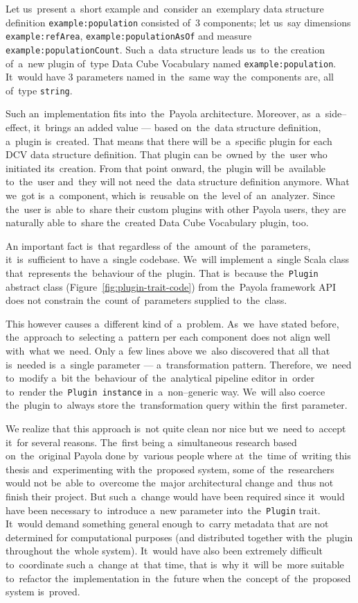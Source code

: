 \begin{sloppypar}
Let us~present a~short example and~consider an~exemplary data structure definition \texttt{example:population}
consisted of~3 
components; let us~say dimensions \texttt{example:refArea}, \texttt{example:populationAsOf}
and measure \texttt{example:populationCount}. Such a~data structure leads us~to~the creation of~a~new plugin of~type Data Cube Vocabulary named 
\texttt{example:population}. It~would have 3 parameters named in~the~same way the~components are, all of~type \texttt{string}.
\end{sloppypar}

Such an~implementation fits into~the~Payola architecture. Moreover, as~a~side--effect, it~brings
an added value --- based on~the~data structure definition, a~plugin is~created. 
That means that there will be~a~specific plugin for each DCV data structure 
definition. That plugin can be~owned by~the~user who initiated its~creation. 
From that point onward, the~plugin will be~available to~the~user and~they
will not need the~data structure definition anymore. What we~got is~a~component, which is~reusable on~the~level of~an~analyzer. Since the~user is~able to~share their custom plugins with other Payola users, they are
naturally able to~share the~created Data Cube Vocabulary plugin, too. 

An important fact is~that regardless of~the~amount of~the~parameters, it~is~sufficient 
to have a~single codebase. We~will implement a~single Scala class that~represents the~behaviour 
of the~plugin. That is~because the~\texttt{Plugin} abstract class (Figure~\ref{fig:plugin-trait-code})
from the~Payola framework
API does not constrain the~count of~parameters supplied to~the~class.

This however causes a~different kind of~a~problem. As~we~have stated before, the~approach to~selecting a~pattern per each component does not align well
with~what we~need. Only a~few lines above we~also discovered that all that is~needed is~a~single parameter --- a~transformation pattern. Therefore, we~need to~modify a~bit the~behaviour of~the~analytical pipeline editor in~order to~render the~\texttt{Plugin instance}
in~a~non--generic way. We~will also coerce the~plugin to~always store the~transformation query 
within the~first parameter.

We realize that this approach is~not quite clean nor nice but we~need to~accept it~for several reasons.
The~first being a~simultaneous research based on~the~original Payola done by~various people where
at~the~time of~writing this thesis and~experimenting with the~proposed system, some of~the~researchers 
would not be~able to~overcome the~major architectural change and~thus not finish their project.
But such a~change would have been required since 
it~would have been necessary to~introduce a~new parameter into~the~\texttt{Plugin} trait. 
It~would demand something general enough to~carry metadata that are not determined for 
computational purposes (and distributed together with the~plugin throughout the~whole system).
It~would have also been extremely difficult to~coordinate such 
a~change at~that time, that is~why it~will be~more suitable to~refactor the~implementation in~the~future when the~concept of~the~proposed system is~proved.


